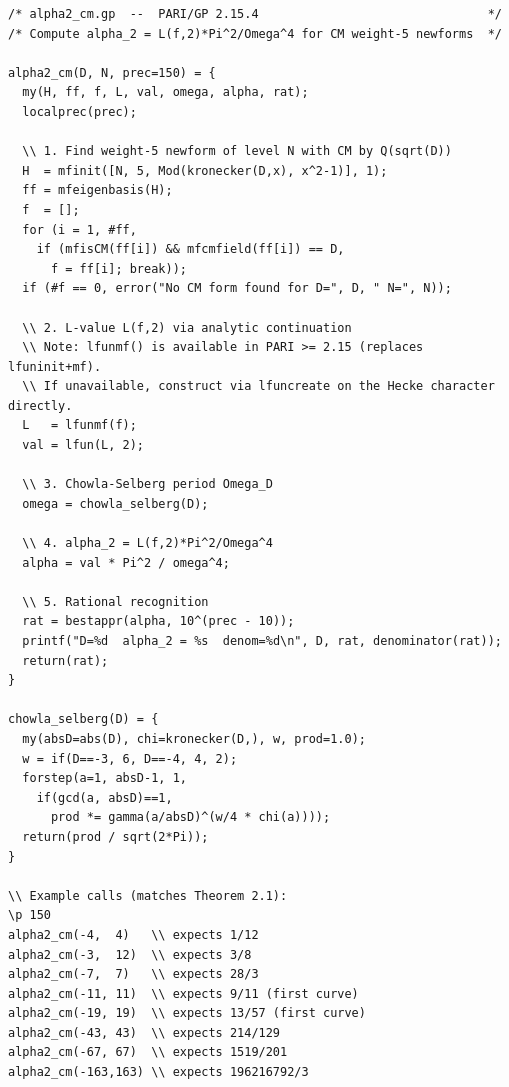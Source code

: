 \documentclass[12pt]{amsart}
\theoremstyle{definition}
\begin{document}
\begin{verbatim}
/* alpha2_cm.gp  --  PARI/GP 2.15.4                                */
/* Compute alpha_2 = L(f,2)*Pi^2/Omega^4 for CM weight-5 newforms  */

alpha2_cm(D, N, prec=150) = {
  my(H, ff, f, L, val, omega, alpha, rat);
  localprec(prec);

  \\ 1. Find weight-5 newform of level N with CM by Q(sqrt(D))
  H  = mfinit([N, 5, Mod(kronecker(D,x), x^2-1)], 1);
  ff = mfeigenbasis(H);
  f  = [];
  for (i = 1, #ff,
    if (mfisCM(ff[i]) && mfcmfield(ff[i]) == D,
      f = ff[i]; break));
  if (#f == 0, error("No CM form found for D=", D, " N=", N));

  \\ 2. L-value L(f,2) via analytic continuation
  \\ Note: lfunmf() is available in PARI >= 2.15 (replaces lfuninit+mf).
  \\ If unavailable, construct via lfuncreate on the Hecke character directly.
  L   = lfunmf(f);
  val = lfun(L, 2);

  \\ 3. Chowla-Selberg period Omega_D
  omega = chowla_selberg(D);

  \\ 4. alpha_2 = L(f,2)*Pi^2/Omega^4
  alpha = val * Pi^2 / omega^4;

  \\ 5. Rational recognition
  rat = bestappr(alpha, 10^(prec - 10));
  printf("D=%d  alpha_2 = %s  denom=%d\n", D, rat, denominator(rat));
  return(rat);
}

chowla_selberg(D) = {
  my(absD=abs(D), chi=kronecker(D,), w, prod=1.0);
  w = if(D==-3, 6, D==-4, 4, 2);
  forstep(a=1, absD-1, 1,
    if(gcd(a, absD)==1,
      prod *= gamma(a/absD)^(w/4 * chi(a))));
  return(prod / sqrt(2*Pi));
}

\\ Example calls (matches Theorem 2.1):
\p 150
alpha2_cm(-4,  4)   \\ expects 1/12
alpha2_cm(-3,  12)  \\ expects 3/8
alpha2_cm(-7,  7)   \\ expects 28/3
alpha2_cm(-11, 11)  \\ expects 9/11 (first curve)
alpha2_cm(-19, 19)  \\ expects 13/57 (first curve)
alpha2_cm(-43, 43)  \\ expects 214/129
alpha2_cm(-67, 67)  \\ expects 1519/201
alpha2_cm(-163,163) \\ expects 196216792/3
\end{verbatim}
\end{document}
